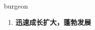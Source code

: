 
\begin{frame}
{\huge burgeon}
\begin{center}
\begin{enumerate}\Large
  \item \textbf{迅速成长扩大，蓬勃发展}
\end{enumerate}
\end{center}
\end{frame}
